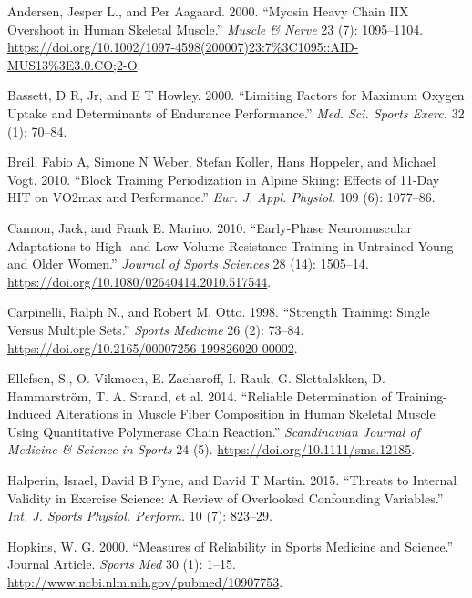 \documentclass[
  letterpaper,
  DIV=11,
  numbers=noendperiod]{scrreprt}
\newlength{\cslhangindent}
\newenvironment{CSLReferences}[2] %
 {\begin{list}{}{%
  \setlength{\itemindent}{0pt}
  \setlength{\leftmargin}{0pt}
  \setlength{\parsep}{0pt}
  \ifodd #1
   \setlength{\leftmargin}{\cslhangindent}
   \setlength{\itemindent}{-1\cslhangindent}
  \fi
  \setlength{\itemsep}{#2\baselineskip}}}
 {\end{list}}
\begin{document}
\begin{CSLReferences}{1}{0}
Andersen, Jesper L., and Per Aagaard. 2000. {``Myosin Heavy Chain IIX
Overshoot in Human Skeletal Muscle.''} \emph{Muscle \& Nerve} 23 (7):
1095--1104.
\url{https://doi.org/10.1002/1097-4598(200007)23:7\%3C1095::AID-MUS13\%3E3.0.CO;2-O}.

Bassett, D R, Jr, and E T Howley. 2000. {``Limiting Factors for Maximum
Oxygen Uptake and Determinants of Endurance Performance.''} \emph{Med.
Sci. Sports Exerc.} 32 (1): 70--84.

Breil, Fabio A, Simone N Weber, Stefan Koller, Hans Hoppeler, and
Michael Vogt. 2010. {``Block Training Periodization in Alpine Skiing:
Effects of 11-Day {HIT} on {VO2max} and Performance.''} \emph{Eur. J.
Appl. Physiol.} 109 (6): 1077--86.

Cannon, Jack, and Frank E. Marino. 2010. {``Early-Phase Neuromuscular
Adaptations to High- and Low-Volume Resistance Training in Untrained
Young and Older Women.''} \emph{Journal of Sports Sciences} 28 (14):
1505--14. \url{https://doi.org/10.1080/02640414.2010.517544}.

Carpinelli, Ralph N., and Robert M. Otto. 1998. {``Strength Training:
Single Versus Multiple Sets.''} \emph{Sports Medicine} 26 (2): 73--84.
\url{https://doi.org/10.2165/00007256-199826020-00002}.

Ellefsen, S., O. Vikmoen, E. Zacharoff, I. Rauk, G. Slettaløkken, D.
Hammarström, T. A. Strand, et al. 2014. {``Reliable Determination of
Training-Induced Alterations in Muscle Fiber Composition in Human
Skeletal Muscle Using Quantitative Polymerase Chain Reaction.''}
\emph{Scandinavian Journal of Medicine \& Science in Sports} 24 (5).
\url{https://doi.org/10.1111/sms.12185}.

Halperin, Israel, David B Pyne, and David T Martin. 2015. {``Threats to
Internal Validity in Exercise Science: A Review of Overlooked
Confounding Variables.''} \emph{Int. J. Sports Physiol. Perform.} 10
(7): 823--29.

Hopkins, W. G. 2000. {``Measures of Reliability in Sports Medicine and
Science.''} Journal Article. \emph{Sports Med} 30 (1): 1--15.
\url{http://www.ncbi.nlm.nih.gov/pubmed/10907753}.


\end{CSLReferences}
\end{document}
